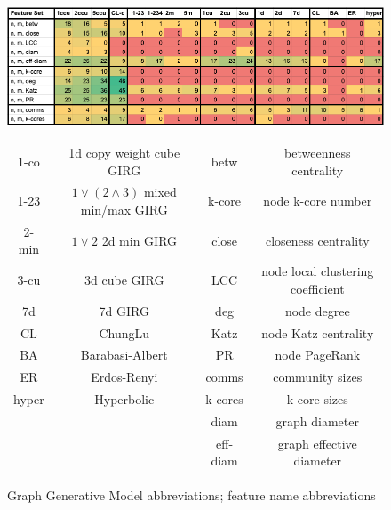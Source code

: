 \begin{figure}
    \centering
    \includegraphics[width=\textwidth]{./figures/Blasius_framework_table.png}
    \caption{\cite{blasius2018towards} GGM comparison framework on Facebook graphs, extended to different GIRG models. Classification accuraciese by SVM use various feature sets. We chose to focus on feature sets involving one core feature (mean, quartile and standard deviation statistics) on top of just number of nodes and edges. If just one of mean/median is used, accuracies are often lower, sometimes even in $50\%-70\%$. $50\%$ is the best possible validation of a GGM as indistinguishable from real data, and is only achieved for feature set $n, m, LCC \;\text{mean}$ (by GIRGs and not the other none geometric GGMs). Some models are missing from the table e.g. 3d-6d GIRGs as their results follow a trend from low to high dimension.
    The model type }
    \vspace{1em}
    \centering
    \begin{tabular}{|c|c||c|c|}
        \hline
        1-co & 1d copy weight cube GIRG 
        & betw & betweenness centrality
        \\
        1-23 & $1 \lor (2 \land 3)$ mixed min/max GIRG
        & k-core & node k-core number
        \\
        2-min & $1 \lor 2$ 2d min GIRG
        & close & closeness centrality
        \\
        3-cu & 3d cube GIRG
        & LCC & node local clustering coefficient
        \\
        7d & 7d GIRG
        & deg & node degree
        \\
        \hline
        CL & ChungLu
        & Katz & node Katz centrality
        \\
        BA & Barabasi-Albert
        & PR & node PageRank
        \\
        ER & Erdos-Renyi
        & comms & community sizes
        \\
        hyper & Hyperbolic
        & k-cores & k-core sizes
        \\
        && diam & graph diameter\\
        && eff-diam & graph effective diameter\\
        \hline
    \end{tabular}
    \caption{Graph Generative Model abbreviations; feature name abbreviations}
\end{figure}

